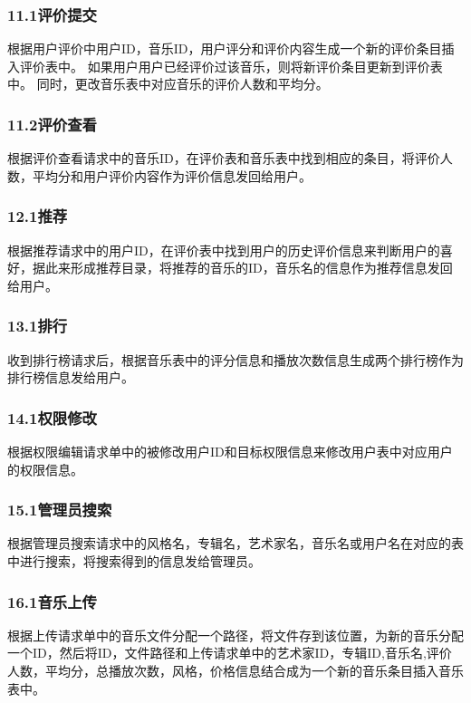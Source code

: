 \subsubsection{11.1评价提交}

根据用户评价中用户ID，音乐ID，用户评分和评价内容生成一个新的评价条目插入评价表中。
如果用户用户已经评价过该音乐，则将新评价条目更新到评价表中。
同时，更改音乐表中对应音乐的评价人数和平均分。
\subsubsection{11.2评价查看}

根据评价查看请求中的音乐ID，在评价表和音乐表中找到相应的条目，将评价人数，平均分和用户评价内容作为评价信息发回给用户。

\subsubsection{12.1推荐}

根据推荐请求中的用户ID，在评价表中找到用户的历史评价信息来判断用户的喜好，据此来形成推荐目录，将推荐的音乐的ID，音乐名的信息作为推荐信息发回给用户。

\subsubsection{13.1排行}

收到排行榜请求后，根据音乐表中的评分信息和播放次数信息生成两个排行榜作为排行榜信息发给用户。

\subsubsection{14.1权限修改}

根据权限编辑请求单中的被修改用户ID和目标权限信息来修改用户表中对应用户的权限信息。

\subsubsection{15.1管理员搜索}

根据管理员搜索请求中的风格名，专辑名，艺术家名，音乐名或用户名在对应的表中进行搜索，将搜索得到的信息发给管理员。

\subsubsection{16.1音乐上传}

根据上传请求单中的音乐文件分配一个路径，将文件存到该位置，为新的音乐分配一个ID，然后将ID，文件路径和上传请求单中的艺术家ID，专辑ID,音乐名,评价人数，平均分，总播放次数，风格，价格信息结合成为一个新的音乐条目插入音乐表中。

